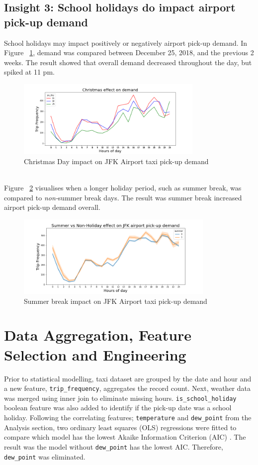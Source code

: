 \documentclass[11pt]{article}
\begin{document}
\subsection{Insight 3: School holidays do impact airport pick-up demand}
School holidays may impact positively or negatively airport pick-up demand. In Figure ~\ref{fig:christmas}, demand was compared between December 25, 2018, and the previous 2 weeks. The result showed that overall demand decreased throughout the day, but spiked at 11 pm.
\begin{figure}[h]
    \includegraphics[width=0.8\textwidth]{plots/school_holiday_Christmas.png}
    \centering
    \caption{Christmas Day impact on JFK Airport taxi pick-up demand} 
    \label{fig:christmas}
\end{figure}
\\
Figure ~\ref{fig:summer} visualises when a longer holiday period, such as summer break, was compared to \textit{non-}summer break days. The result was summer break increased airport pick-up demand overall.
\begin{figure}[h]
    \includegraphics[width=0.85\textwidth]{plots/school_holiday_summer.png}
    \centering
    \caption{Summer break impact on JFK Airport taxi pick-up demand} 
    \label{fig:summer}
\end{figure}

\section{Data Aggregation, Feature Selection and Engineering}
Prior to statistical modelling, taxi dataset are grouped by the date and hour and a new feature, \texttt{trip\_frequency}, aggregates the record count. Next, weather data was merged using inner join to eliminate missing hours. \texttt{is\_school\_holiday} boolean feature was also added to identify if the pick-up date was a school holiday.
Following the correlating features; \texttt{temperature} and \texttt{dew\_point} from the Analysis section, two ordinary least squares (OLS) regressions were fitted to compare which model has the lowest Akaike Information Criterion (AIC) \cite{aic}. The result was the model without \texttt{dew\_point} has the lowest AIC. Therefore, \texttt{dew\_point} was eliminated.
\end{document}
